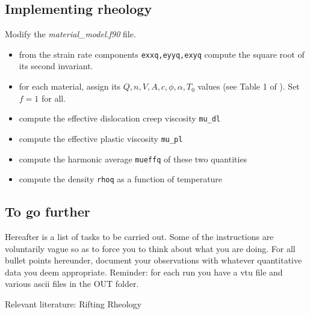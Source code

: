 \documentclass[a4paper]{article}
\begin{document}
\subsection{Implementing rheology}

Modify the {\sl material\_model.f90} file.

\begin{itemize}
\item from the strain rate components {\tt exxq,eyyq,exyq} compute the square root of its second invariant.
\item for each material, assign its $Q,n,V,A,c,\phi,\alpha,T_0$ values (see Table 1 of \cite{nabu15}). Set $f=1$ for all.
\item compute the effective dislocation creep viscosity {\tt mu\_dl}
\item compute the effective plastic viscosity {\tt mu\_pl}
\item compute the harmonic average {\tt mueffq} of these two quantities 
\item compute the density {\tt rhoq} as a function of temperature  
\end{itemize}



\subsection{To go further}

Hereafter is a list of tasks to be carried out. Some of the instructions are voluntarily vague so as to force you to think about what you are doing. For all bullet points hereunder, document your observations with whatever quantitative data you deem appropriate. Reminder: for each run you have a vtu file and various ascii files in the OUT folder. 

Relevant literature: 
Rifting \cite{hube03,hubb05,hube07,hube11,bupb09,alht11,alht12,alhf13,engl83,vacl02} 
Rheology \cite{buro11,budr08,hiko03,kawu93}
\end{document}

